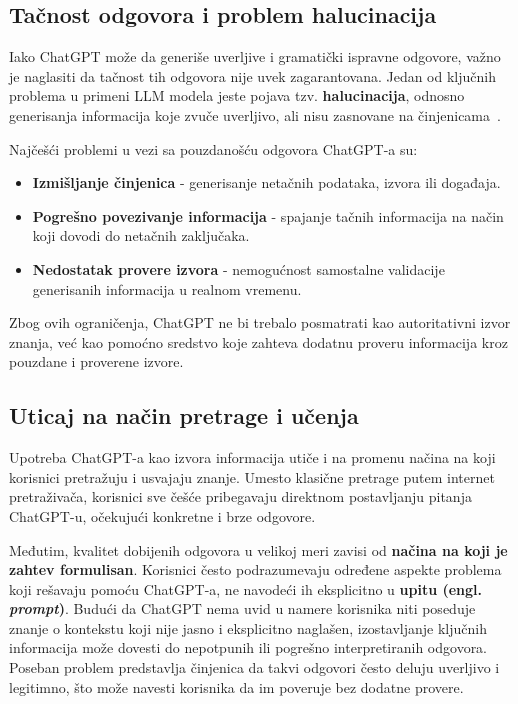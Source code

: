 \documentclass[a4paper, 12pt]{article}
\begin{document}
\subsection{Tačnost odgovora i problem halucinacija}

Iako ChatGPT može da generiše uverljive i gramatički ispravne odgovore, važno je naglasiti da tačnost tih odgovora nije uvek zagarantovana. Jedan od ključnih problema u primeni LLM modela jeste pojava tzv. \textbf{halucinacija}, odnosno generisanja informacija koje zvuče uverljivo, ali nisu zasnovane na činjenicama~\cite{bender2021}.

Najčešći problemi u vezi sa pouzdanošću odgovora ChatGPT-a su:
\begin{itemize}
    \item \textbf{Izmišljanje činjenica} - generisanje netačnih podataka, izvora ili događaja.
    \item \textbf{Pogrešno povezivanje informacija} - spajanje tačnih informacija na
    način koji dovodi do netačnih zaključaka.
    \item \textbf{Nedostatak provere izvora} - nemogućnost samostalne validacije
    generisanih informacija u realnom vremenu.
\end{itemize}

Zbog ovih ograničenja, ChatGPT ne bi trebalo posmatrati kao autoritativni izvor znanja, već kao pomoćno sredstvo koje zahteva dodatnu proveru informacija kroz pouzdane i proverene izvore.

\subsection{Uticaj na način pretrage i učenja}

Upotreba ChatGPT-a kao izvora informacija utiče i na promenu načina na koji korisnici pretražuju i usvajaju znanje. Umesto klasične pretrage putem internet pretraživača, korisnici sve češće pribegavaju direktnom postavljanju pitanja ChatGPT-u, očekujući konkretne i brze odgovore.

Međutim, kvalitet dobijenih odgovora u velikoj meri zavisi od \textbf{načina na koji je zahtev formulisan}. Korisnici često podrazumevaju određene aspekte problema koji rešavaju pomoću ChatGPT-a, ne navodeći ih eksplicitno u \textbf{upitu (engl. \textit{prompt})}. Budući da ChatGPT nema uvid u namere korisnika niti poseduje znanje o kontekstu koji nije jasno i eksplicitno naglašen, izostavljanje ključnih informacija može dovesti do nepotpunih ili pogrešno interpretiranih odgovora. Poseban problem predstavlja činjenica da takvi odgovori često deluju uverljivo i legitimno, što može navesti korisnika da im poveruje bez dodatne provere.
\end{document}
